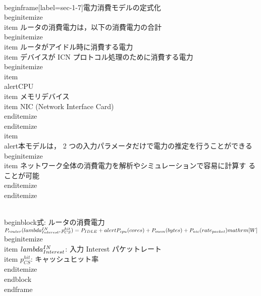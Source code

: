 {\\begin{frame}[label=sec-1-7]{電力消費モデルの定式化}
\\begin{itemize}
\\item ルータの消費電力は，以下の消費電力の合計
\\begin{itemize}
\\item ルータがアイドル時に消費する電力
\\item デバイスが ICN プロトコル処理のために消費する電力
\\begin{itemize}
\\item \\alert{CPU}
\\item メモリデバイス
\\item NIC (Network Interface Card)
\\end{itemize}
\\end{itemize}
\\item \\alert{本モデルは， 2 つの入力パラメータだけで電力の推定を行うことができる}
\\begin{itemize}
\\item ネットワーク全体の消費電力を解析やシミュレーションで容易に計算す
ることが可能
\\end{itemize}
\\end{itemize}

\\begin{block}{式: ルータの消費電力}%
$P_{router}(\\lambda^{IN}_{Interest}, p^{hit}_{CS}) = P_{IDLE} +
\\alert{P_{cpu}(cores)} + P_{mem}(bytes) + P_{nic}(rate_{packet}) \\mathrm{[W]}$
\\begin{itemize}
\\item $\\lambda^{IN}_{Interest}$: 入力 Interest パケットレート
\\item $p^{hit}_{CS}$: キャッシュヒット率
\\end{itemize}
\\end{block}
\\end{frame}

}
